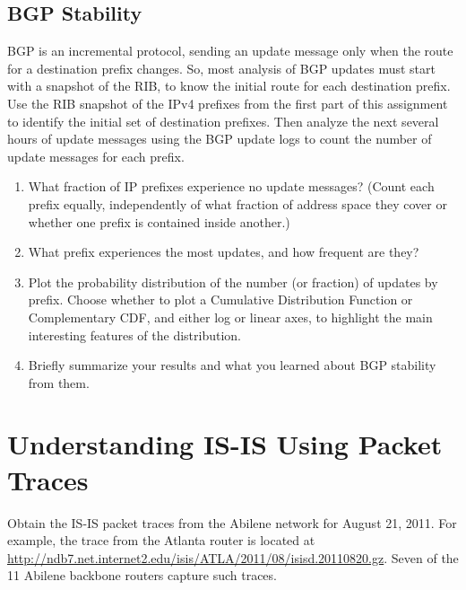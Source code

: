 \documentclass[11pt]{article}
\begin{document}
\subsection*{BGP Stability}

BGP is an incremental protocol, sending an update message only when the
route for a destination preﬁx changes. So, most analysis of BGP updates
must start with a snapshot of the RIB, to know the initial route for
each destination preﬁx. Use the RIB snapshot of the IPv4 prefixes from
the first part of this assignment to identify the initial set
of destination preﬁxes. Then analyze the next several hours of
update messages using the BGP update logs to count the number of update
messages for each preﬁx.

\begin{enumerate}
\item What fraction of IP preﬁxes experience no update messages? (Count each prefix
equally, independently of what fraction of address space they cover or whether one prefix is
contained inside another.) 
\item What prefix experiences the most updates, and how frequent are they?
\item Plot the probability distribution of the number (or fraction) of updates by prefix.
Choose whether to plot a Cumulative Distribution Function or Complementary CDF, and
either log or linear axes, to highlight the main interesting features of the distribution.
\item Brieﬂy summarize your results and what you learned about BGP
  stability from them.
\end{enumerate}

\section{Understanding IS-IS Using Packet Traces}

Obtain the IS-IS packet traces from the Abilene network for August 21,
2011.  For example, the trace from the Atlanta router is located at
{\url{http://ndb7.net.internet2.edu/isis/ATLA/2011/08/isisd.20110820.gz}}.
Seven of the 11 Abilene backbone routers capture such traces.  
\end{document}
